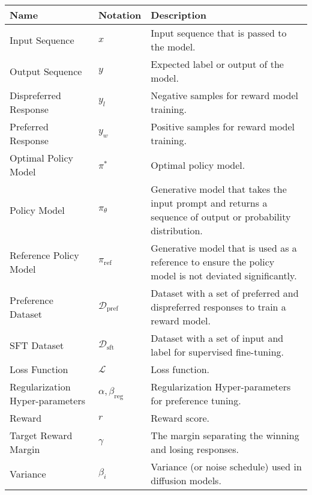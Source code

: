\begin{tabular}{|>{\raggedright\arraybackslash}m{4cm}|>{\raggedright\arraybackslash}m{3cm}|>{\raggedright\arraybackslash}m{7cm}|}
\hline
\textbf{Name} & \textbf{Notation} & \textbf{Description} \\
\hline
Input Sequence & $x$ & Input sequence that is passed to the model. \\
Output Sequence & $y$ & Expected label or output of the model. \\
\hline
Dispreferred Response & $y_l$ & Negative samples for reward model training. \\
Preferred Response & $y_w$ & Positive samples for reward model training. \\
\hline
Optimal Policy Model & $\pi^*$ & Optimal policy model. \\
Policy Model & $\pi_\theta$ & Generative model that takes the input prompt and returns a sequence of output or probability distribution. \\
Reference Policy Model & $\pi_{\text{ref}}$ & Generative model that is used as a reference to ensure the policy model is not deviated significantly. \\
\hline
Preference Dataset & $\mathcal{D}_{\text{pref}}$ & Dataset with a set of preferred and dispreferred responses to train a reward model. \\
SFT Dataset & $\mathcal{D}_{\text{sft}}$ & Dataset with a set of input and label for supervised fine-tuning. \\
\hline
Loss Function & $\mathcal{L}$ & Loss function. \\
Regularization Hyper-parameters & $\alpha, \beta_{\text{reg}}$ & Regularization Hyper-parameters for preference tuning. \\
Reward & $r$ & Reward score. \\
Target Reward Margin & $\gamma$ & The margin separating the winning and losing responses. \\
Variance & $\beta_i$ & Variance (or noise schedule) used in diffusion models. \\
\hline
\end{tabular}